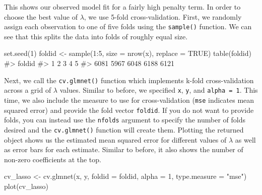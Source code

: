 \documentclass[
  letterpaper,
]{latex/krantz}
\makeatletter
\newenvironment{Shaded}{\begin{snugshade}}{\end{snugshade}}
\newcommand{\AttributeTok}[1]{\textcolor[rgb]{0.40,0.45,0.13}{#1}}
\newcommand{\CommentTok}[1]{\textcolor[rgb]{0.37,0.37,0.37}{#1}}
\newcommand{\ConstantTok}[1]{\textcolor[rgb]{0.56,0.35,0.01}{#1}}
\newcommand{\DecValTok}[1]{\textcolor[rgb]{0.68,0.00,0.00}{#1}}
\newcommand{\FunctionTok}[1]{\textcolor[rgb]{0.28,0.35,0.67}{#1}}
\newcommand{\NormalTok}[1]{\textcolor[rgb]{0.00,0.23,0.31}{#1}}
\newcommand{\OtherTok}[1]{\textcolor[rgb]{0.00,0.23,0.31}{#1}}
\newcommand{\SpecialCharTok}[1]{\textcolor[rgb]{0.37,0.37,0.37}{#1}}
\newcommand{\StringTok}[1]{\textcolor[rgb]{0.13,0.47,0.30}{#1}}
\newenvironment{kframe}{%
\medskip{}
\setlength{\fboxsep}{.8em}
 \def\at@end@of@kframe{}%
 \ifinner\ifhmode%
  \def\at@end@of@kframe{\end{minipage}}%
  \begin{minipage}{\columnwidth}%
 \fi\fi%
 \def\FrameCommand##1{\hskip\@totalleftmargin \hskip-\fboxsep
 \colorbox{shadecolor}{##1}\hskip-\fboxsep
     \hskip-\linewidth \hskip-\@totalleftmargin \hskip\columnwidth}%
 \MakeFramed {\advance\hsize-\width
   \@totalleftmargin\z@ \linewidth\hsize
   \@setminipage}}%
 {\par\unskip\endMakeFramed%
 \at@end@of@kframe}
\renewenvironment{Shaded}{\begin{kframe}}{\end{kframe}}
\makeatother
\begin{document}
This shows our observed model fit for a fairly high penalty term. In
order to choose the best value of \(\lambda\), we use 5-fold
cross-validation. First, we randomly assign each observation to one of
five folds using the
\texttt{sample()}
function. We can see that this splits the data into folds of roughly
equal size.

\begin{Shaded}
\begin{Highlighting}[]
\FunctionTok{set.seed}\NormalTok{(}\DecValTok{1}\NormalTok{)}
\NormalTok{foldid }\OtherTok{\textless{}{-}} \FunctionTok{sample}\NormalTok{(}\DecValTok{1}\SpecialCharTok{:}\DecValTok{5}\NormalTok{, }\AttributeTok{size =} \FunctionTok{nrow}\NormalTok{(x), }\AttributeTok{replace =} \ConstantTok{TRUE}\NormalTok{)}
\FunctionTok{table}\NormalTok{(foldid)}
\CommentTok{\#\textgreater{} foldid}
\CommentTok{\#\textgreater{}    1    2    3    4    5 }
\CommentTok{\#\textgreater{} 6081 5967 6048 6188 6121}
\end{Highlighting}
\end{Shaded}

Next, we call the
\texttt{cv.glmnet()}
function which implements k-fold cross-validation
 across a grid of \(\lambda\) values. Similar to
before, we specified \texttt{x}, \texttt{y}, and \texttt{alpha\ =\ 1}.
This time, we also include the measure to use for cross-validation
(\texttt{mse} indicates mean squared error) and provide the fold vector
\texttt{foldid}. If you do not want to provide folds, you can instead
use the \texttt{nfolds} argument to specify the number of folds desired
and the \texttt{cv.glmnet()} function will create them. Plotting the
returned object shows us the estimated mean squared error for different
values of \(\lambda\) as well as error bars for each estimate. Similar
to before, it also shows the number of non-zero coefficients at the top.

\begin{Shaded}
\begin{Highlighting}[]
\NormalTok{cv\_lasso }\OtherTok{\textless{}{-}} \FunctionTok{cv.glmnet}\NormalTok{(x, y, }\AttributeTok{foldid =}\NormalTok{ foldid, }\AttributeTok{alpha =} \DecValTok{1}\NormalTok{,}
                      \AttributeTok{type.measure =} \StringTok{"mse"}\NormalTok{)}
\FunctionTok{plot}\NormalTok{(cv\_lasso)}
\end{Highlighting}
\end{Shaded}
\end{document}
